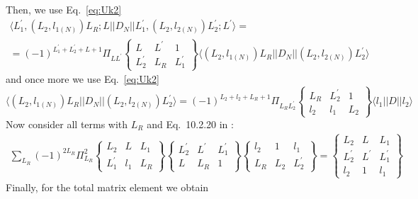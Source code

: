 \documentclass[a4paper,oneside,12pt]{extarticle}
\begin{document}
%
Then, we use Eq.~\ref{eq:Uk2}
%
\begin{multline}
\langle L_1^{\prime}, (L_2, l_{1(N)}) L_R ; L || D_N || L_1^{\prime}, (L_2, l_{2(N)}) L_2^{\prime} ; L^{\prime} \rangle = \\ =
(-1)^{L_1^{\prime}+L_2^{\prime}+L+1} \Pi_{LL^{\prime}}
\left \{
\begin{array}{ccc}
L & L^{\prime} & 1 \\
L_2^{\prime} & L_R & L_1^{\prime}
\end{array}
\right \}
\langle (L_2, l_{1(N)}) L_R || D_N || (L_2, l_{2(N)}) L_2^{\prime} \rangle
\end{multline}
%
and once more we use Eq.~\ref{eq:Uk2}
%
\begin{equation}
\langle (L_2, l_{1(N)}) L_R || D_N || (L_2, l_{2(N)}) L_2^{\prime} \rangle = 
(-1)^{L_2+l_2+L_R+1} \Pi_{L_R L_2^{\prime}}
\left \{
\begin{array}{ccc}
L_R & L_2^{\prime} & 1 \\
l_2 & l_1 & L_2
\end{array}
\right \}
\langle l_1 || D || l_2 \rangle
\end{equation}
%
Now consider all terms with $L_R$ and Eq.~10.2.20 in \cite{Varshalovich}:
%
\begin{multline}
\sum_{L_R} (-1)^{2L_R} \Pi_{L_R}^2
\left \{
\begin{array}{ccc}
L_2 & L & L_1 \\
L_1^{\prime} & l_1 & L_R
\end{array}
\right \}
\left \{
\begin{array}{ccc}
L_2^{\prime} & L^{\prime} & L_1^{\prime} \\
L & L_R & 1
\end{array}
\right \}
\left \{
\begin{array}{ccc}
l_2 & 1 & l_1 \\
L_R & L_2 & L_2^{\prime}
\end{array}
\right \} =
\left \{
\begin{array}{ccc}
L_2 & L & L_1 \\
L_2^{\prime} & L^{\prime} & L_1^{\prime} \\
l_2 & 1 & l_1
\end{array}
\right \}
\end{multline}
%
Finally, for the total matrix element we obtain
%
\end{document}
